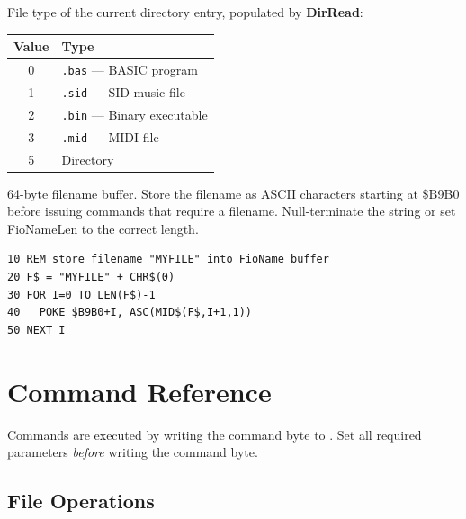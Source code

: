 
File type of the current directory entry, populated by \textbf{DirRead}:

\begin{center}
\small
\begin{tabular}{@{}cl@{}}
\toprule
\textbf{Value} & \textbf{Type} \\
\midrule
0 & \texttt{.bas} --- BASIC program \\
1 & \texttt{.sid} --- SID music file \\
2 & \texttt{.bin} --- Binary executable \\
3 & \texttt{.mid} --- MIDI file \\
5 & Directory \\
\bottomrule
\end{tabular}
\end{center}



64-byte filename buffer.  Store the filename as ASCII characters starting at
\$B9B0 before issuing commands that require a filename.  Null-terminate the
string or set FioNameLen to the correct length.

\begin{lstlisting}
10 REM store filename "MYFILE" into FioName buffer
20 F$ = "MYFILE" + CHR$(0)
30 FOR I=0 TO LEN(F$)-1
40   POKE $B9B0+I, ASC(MID$(F$,I+1,1))
50 NEXT I
\end{lstlisting}


\section{Command Reference}
\label{sec:fio-commands}

Commands are executed by writing the command byte to .  Set all
required parameters \emph{before} writing the command byte.

\subsection{File Operations}

